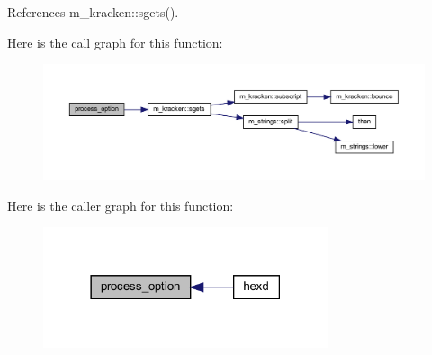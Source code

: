 References m\+\_\+kracken\+::sgets().

Here is the call graph for this function\+:
\nopagebreak
\begin{figure}[H]
\begin{center}
\leavevmode
\includegraphics[width=350pt]{alphabet_8f90_a697200725bfc294a3efd62fcb58b7255_cgraph}
\end{center}
\end{figure}
Here is the caller graph for this function\+:
\nopagebreak
\begin{figure}[H]
\begin{center}
\leavevmode
\includegraphics[width=237pt]{alphabet_8f90_a697200725bfc294a3efd62fcb58b7255_icgraph}
\end{center}
\end{figure}
